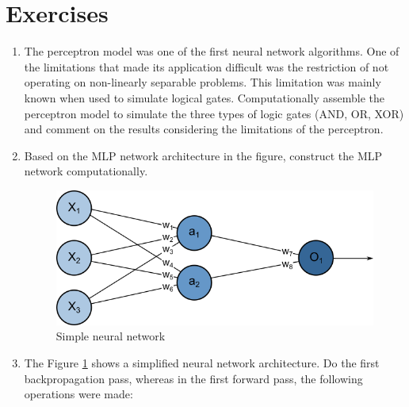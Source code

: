 \newpage
\section{Exercises}

\begin{enumerate}

\iffalse
\item \noindent The perceptron model was one of the first neural network algorithms. One of the limitations that made its application difficult was the restriction of not operating on non-linearly separable problems. This limitation was mainly known when used to simulate logical gates. Computationally assemble the perceptron model to simulate the three types of logic gates (AND, OR, XOR) and comment on the results considering the limitations of the perceptron.


\item \noindent  Based on the MLP network architecture in the figure, construct the MLP network computationally.
\begin{figure}
    \centering
    \includegraphics[scale=0.65]{images/backpropagation_ex.png}
    \caption{Simple neural network}
    \label{fig:exercise7}
\end{figure}

\item \noindent The Figure \ref{fig:exercise7} shows a simplified neural network architecture. Do the first backpropagation pass, whereas in the first forward pass, the following operations were made:


\end{enumerate}
